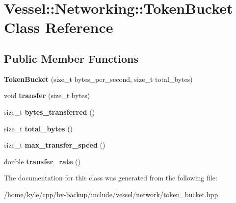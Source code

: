 \hypertarget{class_vessel_1_1_networking_1_1_token_bucket}{}\section{Vessel\+:\+:Networking\+:\+:Token\+Bucket Class Reference}
\label{class_vessel_1_1_networking_1_1_token_bucket}
\subsection*{Public Member Functions}
\begin{DoxyCompactItemize}
\item 
\mbox{\label{class_vessel_1_1_networking_1_1_token_bucket_a7145d9092752774e66941c2e835b4c31}} 
{\bfseries Token\+Bucket} (size\+\_\+t bytes\+\_\+per\+\_\+second, size\+\_\+t total\+\_\+bytes)
\item 
\mbox{\label{class_vessel_1_1_networking_1_1_token_bucket_a5f8ba4fb5a188ad318919ac860e99ce9}} 
void {\bfseries transfer} (size\+\_\+t bytes)
\item 
\mbox{\label{class_vessel_1_1_networking_1_1_token_bucket_aa3a4d1f1713e15f20402a58d5fa6d5fd}} 
size\+\_\+t {\bfseries bytes\+\_\+transferred} ()
\item 
\mbox{\label{class_vessel_1_1_networking_1_1_token_bucket_a1e71926ab7a704e7fad64b7b8a02f69c}} 
size\+\_\+t {\bfseries total\+\_\+bytes} ()
\item 
\mbox{\label{class_vessel_1_1_networking_1_1_token_bucket_a71ca17655034372439530e8f48b99e13}} 
size\+\_\+t {\bfseries max\+\_\+transfer\+\_\+speed} ()
\item 
\mbox{\label{class_vessel_1_1_networking_1_1_token_bucket_a2f81db7c57fe4d2f6795a072f222d2df}} 
double {\bfseries transfer\+\_\+rate} ()
\end{DoxyCompactItemize}


The documentation for this class was generated from the following file\+:\begin{DoxyCompactItemize}
\item 
/home/kyle/cpp/bv-\/backup/include/vessel/network/token\+\_\+bucket.\+hpp\end{DoxyCompactItemize}

